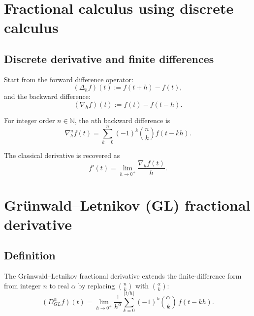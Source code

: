 
\section{Fractional calculus using discrete calculus}

\subsection{Discrete derivative and finite differences}
Start from the forward difference operator:
\begin{equation}
(\Delta_h f)(t) := f(t+h)-f(t),
\end{equation}
and the backward difference:
\begin{equation}
(\nabla_h f)(t) := f(t)-f(t-h).
\end{equation}

For integer order $n\in\mathbb{N}$, the $n$th backward difference is
\begin{equation}
\nabla_h^n f(t)
=
\sum_{k=0}^{n}(-1)^k\binom{n}{k}f(t-kh).
\end{equation}

The classical derivative is recovered as
\begin{equation}
f'(t)=\lim_{h\to 0^+}\frac{\nabla_h f(t)}{h}.
\end{equation}


\section{Grünwald--Letnikov (GL) fractional derivative}

\subsection{Definition}
The Grünwald--Letnikov fractional derivative extends the finite-difference form
from integer $n$ to real $\alpha$ by replacing $\binom{n}{k}$ with $\binom{\alpha}{k}$:
\begin{equation}
\boxed{
(D_{GL}^\alpha f)(t)
=
\lim_{h\to 0^+}\frac{1}{h^\alpha}
\sum_{k=0}^{\lfloor t/h\rfloor}(-1)^k\binom{\alpha}{k}\,f(t-kh).
}
\end{equation}

